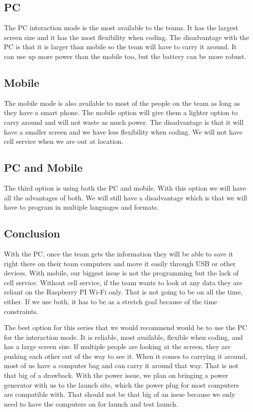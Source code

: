 \documentclass[10pt,draftclsnofoot,onecolumn]{IEEEtran}
\begin{document}
   	\subsection{PC}
   	The PC interaction mode is the most available to the teams. It has the largest screen size and it has the most
	flexibility when coding. The disadvantage with the PC is that it is larger than mobile so the team will have to carry it around. 
	It can use up more power than the mobile too, but the battery can be more robust.

   	\subsection{Mobile}
   	The mobile mode is also available to most of the people on the team as long as they have a smart phone. 
	The mobile option will give them a lighter option to carry around and will not waste as much power. 
	The disadvantage is that it will have a smaller screen and we have less flexibility when coding.  
	We will not have cell service when we are out at location.

   	\subsection{PC and Mobile}
    The third option is using both the PC and mobile. 
	With this option we will have all the advantages of both. 
	We will still have a disadvantage which is that we will have to program in multiple languages and formats. 

   	\subsection{Conclusion}
   	With the PC, once the team gets the information they will be able to save it right there on their team computers and move it
	easily through USB or other devices. 
	With mobile, our biggest issue is not the programming but the lack of cell service.
	Without cell service, if the team wants to look at any data they are reliant on the Raspberry PI Wi-Fi only. 
	That is not going to be on all the time, either. 
	If we use both, it has to be as a stretch goal because of the time constraints.  

   	The best option for this series that we would recommend would be to use the PC for the interaction mode. 
	It is reliable, most available, flexible when coding, and has a large screen size. 
	If multiple people are looking at the screen, they are pushing each other out of the way to see it. 
	When it comes to carrying it around, most of us have a computer bag and can carry it around that way. 
	That is not that big of a drawback. 
	With the power issue, we plan on bringing a power generator with us to the launch site, which the power plug for most computers
	are compatible with. 
	That should not be that big of an issue because we only need to have the computers on for launch and test launch.
	
\end{document}
